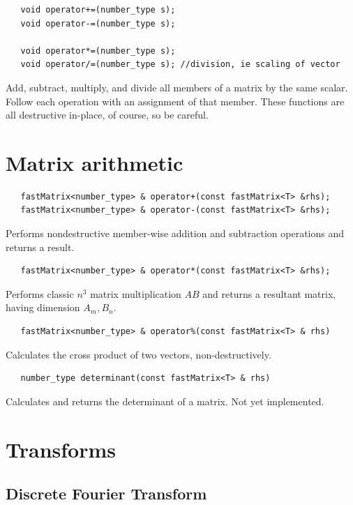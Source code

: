 \documentclass[10pt,fullpage]{article}
\begin{document}
\begin{verbatim}
   void operator+=(number_type s);
   void operator-=(number_type s);

   void operator*=(number_type s);
   void operator/=(number_type s); //division, ie scaling of vector
\end{verbatim}

Add, subtract, multiply, and divide all members of a matrix by the
same scalar. Follow each operation with an assignment of that
member. These functions are all destructive in-place, of course, so
be careful.

\section{Matrix arithmetic}

\begin{verbatim}
   fastMatrix<number_type> & operator+(const fastMatrix<T> &rhs);
   fastMatrix<number_type> & operator-(const fastMatrix<T> &rhs);
\end{verbatim}

Performs nondestructive member-wise addition and subtraction
operations and returns a result.

\begin{verbatim}
   fastMatrix<number_type> & operator*(const fastMatrix<T> &rhs);
\end{verbatim}

Performs classic $n^3$ matrix multiplication $AB$ and returns a
resultant matrix, having dimension $A_m,B_n$.

\begin{verbatim}
   fastMatrix<number_type> & operator%(const fastMatrix<T> & rhs)
\end{verbatim}

Calculates the cross product of two vectors, non-destructively.

\begin{verbatim}
   number_type determinant(const fastMatrix<T> & rhs)
\end{verbatim}

Calculates and returns the determinant of a matrix. Not yet
implemented.


\newpage
\section{Transforms}

\subsection{Discrete Fourier Transform}
\end{document}

